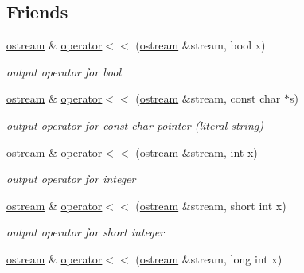 \subsection*{Friends}
\begin{DoxyCompactItemize}
\item 
\hyperlink{classhwlib_1_1ostream}{ostream} \& \hyperlink{classhwlib_1_1ostream_a253a2e284130cc22d3dff3fbf669afae}{operator$<$$<$} (\hyperlink{classhwlib_1_1ostream}{ostream} \&stream, bool x)\hypertarget{classhwlib_1_1ostream_a253a2e284130cc22d3dff3fbf669afae}{}\label{classhwlib_1_1ostream_a253a2e284130cc22d3dff3fbf669afae}

\begin{DoxyCompactList}\small\item\em output operator for bool \end{DoxyCompactList}\item 
\hyperlink{classhwlib_1_1ostream}{ostream} \& \hyperlink{classhwlib_1_1ostream_a45bbf00f11c411f55e5eef9b28165fa6}{operator$<$$<$} (\hyperlink{classhwlib_1_1ostream}{ostream} \&stream, const char $\ast$s)\hypertarget{classhwlib_1_1ostream_a45bbf00f11c411f55e5eef9b28165fa6}{}\label{classhwlib_1_1ostream_a45bbf00f11c411f55e5eef9b28165fa6}

\begin{DoxyCompactList}\small\item\em output operator for const char pointer (literal string) \end{DoxyCompactList}\item 
\hyperlink{classhwlib_1_1ostream}{ostream} \& \hyperlink{classhwlib_1_1ostream_a28ee741656d0ad9d6a1782823212e7d9}{operator$<$$<$} (\hyperlink{classhwlib_1_1ostream}{ostream} \&stream, int x)\hypertarget{classhwlib_1_1ostream_a28ee741656d0ad9d6a1782823212e7d9}{}\label{classhwlib_1_1ostream_a28ee741656d0ad9d6a1782823212e7d9}

\begin{DoxyCompactList}\small\item\em output operator for integer \end{DoxyCompactList}\item 
\hyperlink{classhwlib_1_1ostream}{ostream} \& \hyperlink{classhwlib_1_1ostream_a5f10f89fa98ac5e5f89cc2af0e9b0b6e}{operator$<$$<$} (\hyperlink{classhwlib_1_1ostream}{ostream} \&stream, short int x)\hypertarget{classhwlib_1_1ostream_a5f10f89fa98ac5e5f89cc2af0e9b0b6e}{}\label{classhwlib_1_1ostream_a5f10f89fa98ac5e5f89cc2af0e9b0b6e}

\begin{DoxyCompactList}\small\item\em output operator for short integer \end{DoxyCompactList}\item 
\hyperlink{classhwlib_1_1ostream}{ostream} \& \hyperlink{classhwlib_1_1ostream_af269c1256dc5c755fafc13a7b9125187}{operator$<$$<$} (\hyperlink{classhwlib_1_1ostream}{ostream} \&stream, long int x)\hypertarget{classhwlib_1_1ostream_af269c1256dc5c755fafc13a7b9125187}{}\label{classhwlib_1_1ostream_af269c1256dc5c755fafc13a7b9125187}


\end{DoxyCompactItemize}
